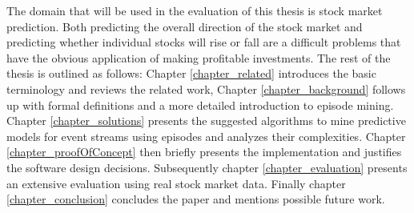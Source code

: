 The domain that will be used in the evaluation of this thesis is stock market prediction. Both predicting the overall direction of the stock market and predicting whether individual stocks will rise or fall are a difficult problems that have the obvious application of making profitable investments. \newline
The rest of the thesis is outlined as follows: Chapter \ref{chapter_related} introduces the basic terminology and reviews the related work, Chapter \ref{chapter_background} follows up with formal definitions and a more detailed introduction to episode mining. Chapter \ref{chapter_solutions} presents the suggested algorithms to mine predictive models for event streams using episodes and analyzes their complexities. Chapter \ref{chapter_proofOfConcept} then briefly presents the implementation and justifies the software design decisions. Subsequently chapter \ref{chapter_evaluation} presents an extensive evaluation using real stock market data. Finally chapter \ref{chapter_conclusion} concludes the paper and mentions possible future work.